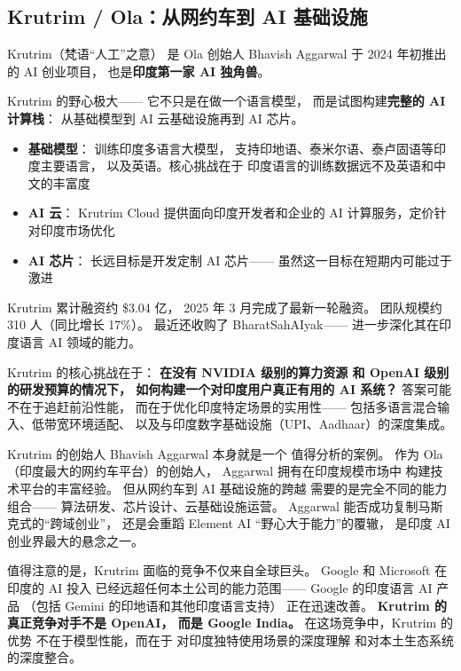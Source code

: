 \subsection{Krutrim / Ola：从网约车到 AI 基础设施}

Krutrim（梵语``人工''之意）
是 Ola 创始人 Bhavish Aggarwal 于 2024 年初推出的
AI 创业项目，
也是\textbf{印度第一家 AI 独角兽}。

Krutrim 的野心极大——
它不只是在做一个语言模型，
而是试图构建\textbf{完整的 AI 计算栈}：
从基础模型到 AI 云基础设施再到 AI 芯片。

\begin{itemize}[noitemsep]
  \item \textbf{基础模型}：
        训练印度多语言大模型，
        支持印地语、泰米尔语、泰卢固语等印度主要语言，
        以及英语。核心挑战在于
        印度语言的训练数据远不及英语和中文的丰富度
  \item \textbf{AI 云}：
        Krutrim Cloud 提供面向印度开发者和企业的
        AI 计算服务，定价针对印度市场优化
  \item \textbf{AI 芯片}：
        长远目标是开发定制 AI 芯片——
        虽然这一目标在短期内可能过于激进
\end{itemize}

Krutrim 累计融资约 \$3.04 亿，
2025 年 3 月完成了最新一轮融资。
团队规模约 310 人（同比增长 17\%）。
最近还收购了 BharatSahAIyak——
进一步深化其在印度语言 AI 领域的能力。

Krutrim 的核心挑战在于：
\textbf{在没有 NVIDIA 级别的算力资源
和 OpenAI 级别的研发预算的情况下，
如何构建一个对印度用户真正有用的 AI 系统？}
答案可能不在于追赶前沿性能，
而在于优化印度特定场景的实用性——
包括多语言混合输入、低带宽环境适配、
以及与印度数字基础设施（UPI、Aadhaar）的深度集成。

Krutrim 的创始人 Bhavish Aggarwal 本身就是一个
值得分析的案例。
作为 Ola（印度最大的网约车平台）的创始人，
Aggarwal 拥有在印度规模市场中
构建技术平台的丰富经验。
但从网约车到 AI 基础设施的跨越
需要的是完全不同的能力组合——
算法研发、芯片设计、云基础设施运营。
Aggarwal 能否成功复制马斯克式的``跨域创业''，
还是会重蹈 Element AI ``野心大于能力''的覆辙，
是印度 AI 创业界最大的悬念之一。

值得注意的是，Krutrim 面临的竞争不仅来自全球巨头。
Google 和 Microsoft 在印度的 AI 投入
已经远超任何本土公司的能力范围——
Google 的印度语言 AI 产品
（包括 Gemini 的印地语和其他印度语言支持）
正在迅速改善。
\textbf{Krutrim 的真正竞争对手不是 OpenAI，
而是 Google India。}
在这场竞争中，Krutrim 的优势
不在于模型性能，而在于
对印度独特使用场景的深度理解
和对本土生态系统的深度整合。

